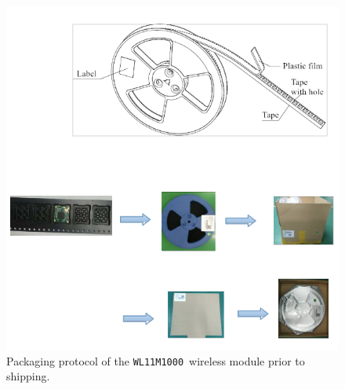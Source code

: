 \documentclass{scrreprt}
\newcommand{\modelno}{\texttt{WL11M1000}}
\begin{document}
\begin{CJK*}{UTF8}{gbsn}
\begin{figure}[H]
\caption{Packaging protocol of the \modelno\ wireless module prior to shipping.}
\includegraphics[width=\textwidth]{packaging.png}
\end{figure}

\end{CJK*}
\end{document}
